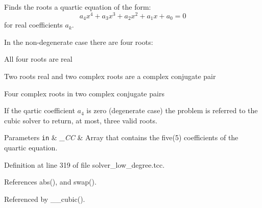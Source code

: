 Finds the roots a quartic equation of the form\+: \[ a_4 x^4 + a_3 x^3 + a_2 x^2 + a_1 x + a_0 = 0 \] for real coefficients $ a_k $. 

In the non-\/degenerate case there are four roots\+:
\begin{DoxyItemize}
\item All four roots are real
\item Two roots real and two complex roots are a complex conjugate pair
\item Four complex roots in two complex conjugate pairs
\end{DoxyItemize}

If the qartic coefficient $ a_4 $ is zero (degenerate case) the problem is referred to the cubic solver to return, at most, three valid roots.


\begin{DoxyParams}[1]{Parameters}
\mbox{\tt in}  & {\em \+\_\+\+CC} & Array that contains the five(5) coefficients of the quartic equation. \\
\hline
\end{DoxyParams}


Definition at line 319 of file solver\+\_\+low\+\_\+degree.\+tcc.



References abs(), and swap().



Referenced by \+\_\+\+\_\+cubic().


